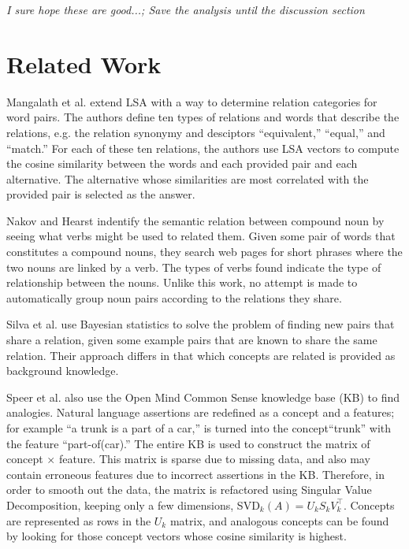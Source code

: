 \documentclass[11pt]{article}
\begin{document}
\emph{I sure hope these are good...; Save the analysis until the discussion
  section}

\section{Related Work}
\label{sec:related}


Mangalath et al. extend LSA\cite{landauer88introduction} with a way to determine
relation categories for word pairs\cite{mangalath04analogy}.  The authors define
ten types of relations and words that describe the relations, e.g. the
relation synonymy and desciptors ``equivalent,'' ``equal,'' and ``match.''  For
each of these ten relations, the authors use LSA vectors to compute the cosine
similarity between the words and each provided pair and each alternative.  The
alternative whose similarities are most correlated with the provided pair is
selected as the answer.

Nakov and Hearst indentify the semantic relation between compound noun by seeing
what verbs might be used to related them\cite{nakov06using}.  Given some pair of
words that constitutes a compound nouns, they search web pages for short phrases
where the two nouns are linked by a verb.  The types of verbs found indicate the
type of relationship between the nouns.  Unlike this work, no attempt is made to
automatically group noun pairs according to the relations they share. 

Silva et al. use Bayesian statistics to solve the problem of finding new pairs
that share a relation, given some example pairs that are known to share the same
relation\cite{silva07analogical}.  Their approach differs in that which concepts
are related is provided as background knowledge.  

Speer et al. also use the Open Mind Common Sense knowledge base (KB) to find
analogies\cite{speer08analogyspace}.  Natural language assertions are redefined
as a concept and a features; for example ``a trunk is a part of a car,'' is
turned into the concept``trunk'' with the feature ``part-of(car).''  The entire
KB is used to construct the matrix of concept $\times$ feature.  This matrix is
sparse due to missing data, and also may contain erroneous features due to
incorrect assertions in the KB.  Therefore, in order to smooth out the data, the
matrix is refactored using Singular Value Decomposition, keeping only a few
dimensions, SVD$_k(A) = U_kS_kV_k^{\top}$.  Concepts are represented as rows
in the $U_k$ matrix, and analogous concepts can be found by looking for those
concept vectors whose cosine similarity is highest.
\end{document}
